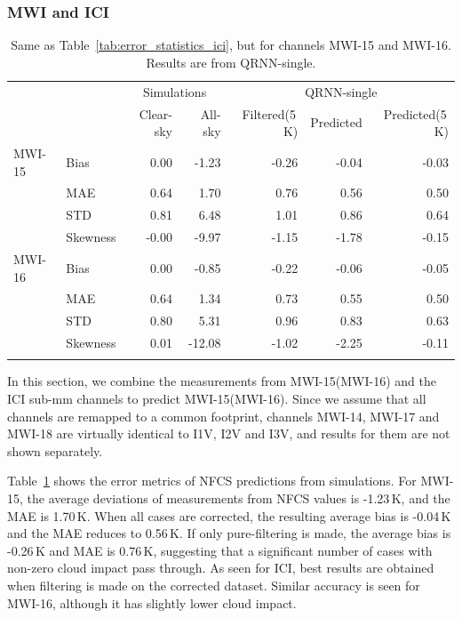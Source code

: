 \documentclass[amt, manuscript]{copernicus}
\begin{document}
\subsubsection{MWI and ICI}
\begin{table}[t]
	\caption{Same as Table~\ref{tab:error_statistics_ici}, but for channels MWI-15 and MWI-16. Results are from QRNN-single.}
	\label{tab:statistics_mwi}
	\begin{tabular}{llrr|rrr}
		\tophline
				&&\multicolumn{2}{c|}{Simulations}& \multicolumn{3}{c}{QRNN-single} \\
				\cline{3-7}
				&&   Clear-sky &   All-sky &  Filtered(5\,K) & Predicted & Predicted(5\,K) \\
		\middlehline
		MWI-15  &Bias     &  0.00 & -1.23 & -0.26 & -0.04 & -0.03 \\
				&MAE      &  0.64 &  1.70 &  0.76 &  0.56 &  0.50 \\
				&STD      &  0.81 &  6.48 &  1.01 &  0.86 &  0.64 \\
				&Skewness & -0.00 & -9.97 & -1.15 & -1.78 & -0.15 \\
		\middlehline
		MWI-16  &Bias     & 0.00 &  -0.85 & -0.22 & -0.06 & -0.05 \\
				&MAE      & 0.64 &   1.34 &  0.73 &  0.55 &  0.50 \\
				&STD      & 0.80 &   5.31 &  0.96 &  0.83 &  0.63 \\
				&Skewness & 0.01 & -12.08 & -1.02 & -2.25 & -0.11 \\
		\bottomhline			
	\end{tabular}	
	\belowtable{} %
\end{table}
In this section, we combine the measurements from MWI-15(MWI-16) and the ICI sub-mm channels to predict MWI-15(MWI-16). Since we assume that all channels are remapped to a common footprint, channels MWI-14, MWI-17 and MWI-18 are virtually identical to I1V, I2V and I3V, and results for them are not shown separately.

Table~\ref{tab:statistics_mwi} shows the error metrics of NFCS predictions from simulations. For MWI-15, the average deviations of measurements from NFCS values is -1.23\,K, and the MAE is 1.70\,K. When all cases are corrected, the resulting average bias is -0.04\,K and the MAE reduces to 0.56\,K. If only pure-filtering is made, the average bias is -0.26\,K and MAE is 0.76\,K, suggesting that a significant number of cases with non-zero cloud impact pass through. As seen for ICI, best results are obtained  when filtering is made on the corrected dataset. Similar accuracy is seen for MWI-16, although it has slightly lower cloud impact. 
\end{document}
